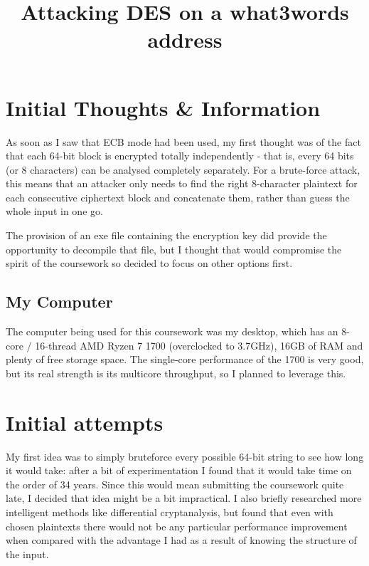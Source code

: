 \documentclass[11pt]{article} %
\title{\vspace{-1.6cm}Attacking DES on a what3words address}
\date{} %
\begin{document}
\maketitle

\vspace{-1.5cm}

\section{Initial Thoughts \& Information}

As soon as I saw that ECB mode had been used, my first thought was of the fact that each 64-bit block is encrypted totally independently - that is, every 64 bits (or 8 characters) can be analysed completely separately. For a brute-force attack, this means that an attacker only needs to find the right 8-character plaintext for each consecutive ciphertext block and concatenate them, rather than guess the whole input in one go.

The provision of an exe file containing the encryption key did provide the opportunity to decompile that file, but I thought that would compromise the spirit of the coursework so decided to focus on other options first.

\subsection{My Computer}

The computer being used for this coursework was my desktop, which has an 8-core / 16-thread AMD Ryzen 7 1700 (overclocked to 3.7GHz), 16GB of RAM and plenty of free storage space. The single-core performance of the 1700 is very good, but its real strength is its multicore throughput, so I planned to leverage this.

\section{Initial attempts}

My first idea was to simply bruteforce every possible 64-bit string to see how long it would take: after a bit of experimentation I found that it would take time on the order of 34 years. Since this would mean submitting the coursework quite late, I decided that idea might be a bit impractical. I also briefly researched more intelligent methods like differential cryptanalysis, but found that even with chosen plaintexts there would not be any particular performance improvement when compared with the advantage I had as a result of knowing the structure of the input.
\end{document}
